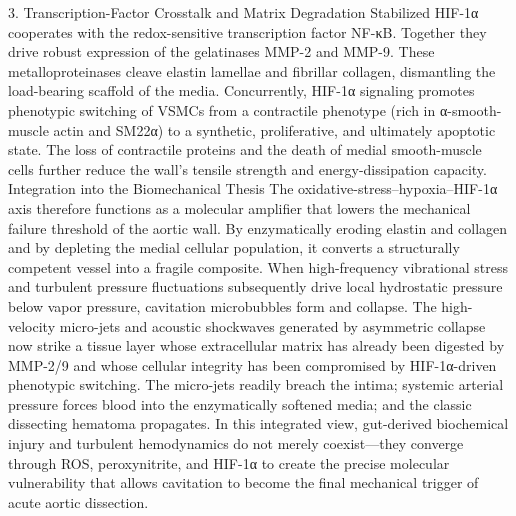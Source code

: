 3. Transcription-Factor Crosstalk and Matrix Degradation
Stabilized HIF-1α cooperates with the redox-sensitive transcription factor NF-κB. Together they drive robust expression of the gelatinases MMP-2 and MMP-9. These metalloproteinases cleave elastin lamellae and fibrillar collagen, dismantling the load-bearing scaffold of the media. Concurrently, HIF-1α signaling promotes phenotypic switching of VSMCs from a contractile phenotype (rich in α-smooth-muscle actin and SM22α) to a synthetic, proliferative, and ultimately apoptotic state. The loss of contractile proteins and the death of medial smooth-muscle cells further reduce the wall’s tensile strength and energy-dissipation capacity.
Integration into the Biomechanical Thesis
The oxidative-stress–hypoxia–HIF-1α axis therefore functions as a molecular amplifier that lowers the mechanical failure threshold of the aortic wall. By enzymatically eroding elastin and collagen and by depleting the medial cellular population, it converts a structurally competent vessel into a fragile composite. When high-frequency vibrational stress and turbulent pressure fluctuations subsequently drive local hydrostatic pressure below vapor pressure, cavitation microbubbles form and collapse. The high-velocity micro-jets and acoustic shockwaves generated by asymmetric collapse now strike a tissue layer whose extracellular matrix has already been digested by MMP-2/9 and whose cellular integrity has been compromised by HIF-1α-driven phenotypic switching. The micro-jets readily breach the intima; systemic arterial pressure forces blood into the enzymatically softened media; and the classic dissecting hematoma propagates. In this integrated view, gut-derived biochemical injury and turbulent hemodynamics do not merely coexist—they converge through ROS, peroxynitrite, and HIF-1α to create the precise molecular vulnerability that allows cavitation to become the final mechanical trigger of acute aortic dissection.
